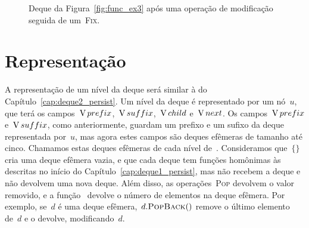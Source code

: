 \documentclass[main.tex]{subfiles}
\begin{document}
\begin{figure}[h]
\centering
{}
\caption{Deque da Figura~\ref{fig:func_ex3} após uma operação de modificação seguida de um~\textsc{Fix}.} \label{fig:func_ex3res}
\end{figure}

\section{Representação}

A representação de um nível da deque será similar à do Capítulo~\ref{cap:deque2_persist}. Um nível da deque é representado por um nó~$u$, que terá os campos~$\operatorname{V}{prefix}$,~$\operatorname{V}{suffix}$,~$\operatorname{V}{child}$ e~$\operatorname{V}{next}$.
Os campos~$\operatorname{V}{prefix}$ e~$\operatorname{V}{suffix}$, como anteriormente, guardam um prefixo e um sufixo da deque representada por~$u$, mas agora estes campos são deques efêmeras de tamanho até cinco. Chamamos estas deques efêmeras de cada nível de~. Consideramos que~$\{\}$ cria uma deque efêmera vazia, e que cada deque tem funções homônimas às descritas no início do Capítulo~\ref{cap:deque1_persist}, mas não recebem a deque e não devolvem uma nova deque. Além disso, as operações~\textsc{Pop} devolvem o valor removido, e a função~ devolve o número de elementos na deque efêmera. Por exemplo, se~$d$ é uma deque efêmera,~$d.\mbox{\textsc{PopBack}\ensuremath{()}}$ remove o último elemento de~$d$ e o devolve, modificando~$d$.
\end{document}
